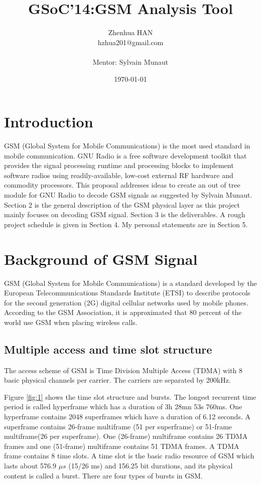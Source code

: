\documentclass[a4paper,12pt,oneside]{article}
\title{GSoC'14:GSM Analysis Tool}
\date{\today}
\author{Zhenhua HAN\\ hzhua201@gmail.com\\ \\Mentor: Sylvain Munaut}
\begin{document}
\maketitle
\tableofcontents
\newpage
\section{Introduction}
GSM (Global System for Mobile Communications) is the most used standard in mobile communication. GNU Radio is a free software development toolkit that provides the signal processing runtime and processing blocks to implement software radios using readily-available, low-cost external RF hardware and commodity processors.\cite{gnuradio} This proposal addresses ideas to create an out of tree module for GNU Radio to decode GSM signals as suggested by Sylvain Munaut. Section 2 is the general description of the GSM physical layer as this project mainly focuses on decoding GSM signal. Section 3 is the deliverables. A rough project schedule is given in Section 4. My personal statements are in Section 5.
\section{Background of GSM Signal}
GSM (Global System for Mobile Communications) is a standard developed by the European Telecommunications Standards Institute (ETSI) to describe protocols for the second generation (2G) digital cellular networks used by mobile phones. According to the GSM Association, it is approximated that 80 percent of the world use GSM when placing wireless calls.

\subsection{Multiple access and time slot structure}
The access scheme of GSM is Time Division Multiple Access (TDMA) with 8 basic physical channels per carrier. The carriers are separated by 200kHz.

Figure \ref{fig:1} shows the time slot structure and bursts. The longest recurrent time period is called hyperframe which has a duration of 3h 28mn 53s 760ms. One hyperframe contains 2048 superframes which have a duration of 6.12 seconds. A superframe contains 26-frame multiframe (51 per superframe) or 51-frame multiframe(26 per superframe). One (26-frame) multiframe contains 26 TDMA frames and one (51-frame) multiframe contains 51 TDMA frames. A TDMA frame contains 8 time slots. A time slot is the basic radio resource of GSM which lasts about 576.9 $\mu s$ (15/26 ms) and 156.25 bit durations, and its physical content is called a burst. There are four types of bursts in GSM.
\end{document}
